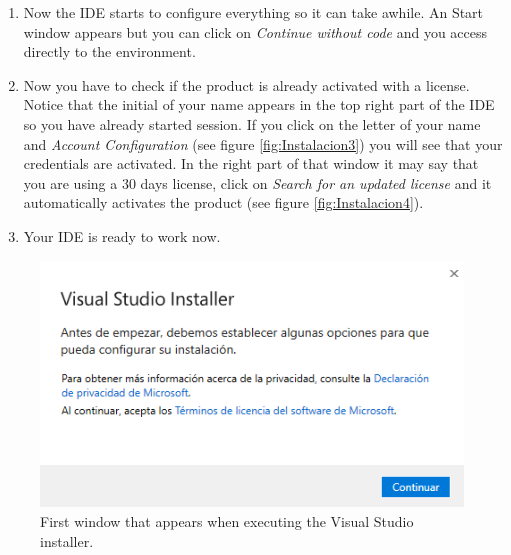 \begin{enumerate}
    \item Now the IDE starts to configure everything so it can take awhile. An Start window appears but you can click on \textit{Continue without code} and you access directly to the environment.
    
    \item Now you have to check if the product is already activated with a license. Notice that the initial of your name appears in the top right part of the IDE so you have already started session. If you click on the letter of your name and \textit{Account Configuration} (see figure \ref{fig:Instalacion3}) you will see that your credentials are activated. In the right part of that window it may say that you are using a 30 days license, click on \textit{Search for an updated license} and it automatically activates the product (see figure \ref{fig:Instalacion4}).
    
    \item Your IDE is ready to work now. 
    
\end{enumerate}

\begin{figure}
    \centering
    \includegraphics[width=  \textwidth]{Figures/Instalacion-1}
    \caption{First window that appears when executing the Visual Studio installer.}
    \label{fig:Instalacion-1}
\end{figure}

